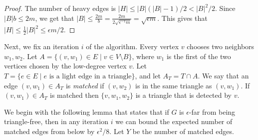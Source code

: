 \documentclass[11pt]{article}
\begin{document}
\begin{proof}
The number of heavy edges is $|H| \leq |B|(|B|-1)/2 < |B|^2/2$. Since $|B|b  \leq 2m$, we get that $|B| \leq \frac{2m}{b} = \frac{2m}{2\sqrt{\epsilon^{-1} m}} = \sqrt{\epsilon m}$.
This gives that $|H| \leq \frac{1}{2}|B|^2 \leq  \epsilon m / 2$.
\end{proof}

Next, we fix an iteration $i$ of the algorithm. Every vertex $v$ chooses two neighbors $w_1, w_2$. Let $A=\{(v,w_1)\in E \mid v \in V\setminus B\}$, where $w_1$ is the first of the two vertices chosen by the low-degree vertex $v$. Let $T=\{e \in E \mid \text{$e$ is a light edge in a triangle}\}$, and let $A_T = T\cap A$.
We say that an edge $(v,w_1) \in A_T$ is \emph{matched} if $(v,w_2)$ is in the same triangle as $(v,w_1)$.
If $(v,w_1) \in A_T$ is matched then $\{v,w_1,w_2\}$ is a triangle that is detected by $v$.

We begin with the following lemma that states that if $G$ is $\epsilon$-far from being triangle-free, then in any iteration $i$ we can bound the expected number of matched edges from below by $\epsilon^2/8$. Let $Y$ be the number of matched edges.
\end{document}
